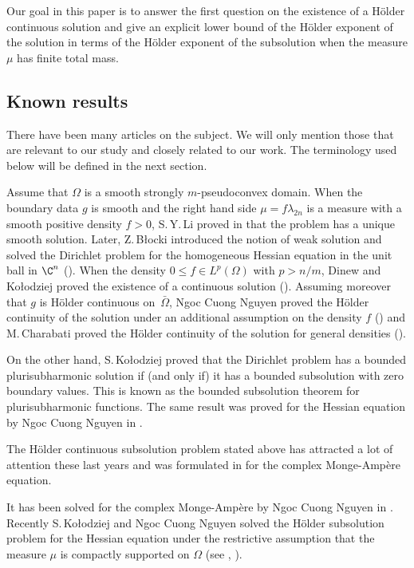 Our goal in this paper is to answer the first question on the existence of a Hölder continuous solution and give an explicit lower bound of the Hölder exponent of the solution in terms of the Hölder exponent of the subsolution when the measure $\mu$ has finite total mass.

\subsection{Known results}
There have been many articles on the subject. We will only mention those that are relevant to our study and closely related to our work.
The terminology used below will be defined in the next section.

Assume that $\Omega$ is a smooth strongly $m$-pseudoconvex domain. When the boundary data $g$ is smooth and the right hand side $\mu = f \lambda_{2n}$ is a measure with a smooth positive density $f > 0$, S.\,Y.\,Li proved in \cite{Li04} that the problem has a unique smooth solution. Later, Z.\,B\l ocki introduced the notion of weak solution and solved the Dirichlet problem for the homogeneous Hessian equation in the unit ball in $\C^n$ (\cite{Bl05}).
When the density $0 \leq f \in L^p (\Omega)$ with $p > n \slash m$, Dinew and Ko\l odziej proved the existence of a continuous solution (\cite{DK14}). Assuming moreover that $g$ is Hölder continuous on~$\bar \Omega$, Ngoc Cuong Nguyen proved the Hölder continuity of the solution under an additional assumption on the density $f$ (\cite{N14}) and M.\,Charabati proved the Hölder continuity of the solution for general densities (\cite{Ch16}).

On the other hand, S.\,Ko\l odziej \cite{Kol05} proved that the Dirichlet problem has a bounded plurisubharmonic solution if (and only if) it has a bounded subsolution with zero boundary values. This is known as the bounded subsolution theorem for plurisubharmonic functions. The same result was proved for the Hessian equation by Ngoc Cuong Nguyen in \cite{N13}.

The Hölder continuous subsolution problem stated above has attracted a lot of attention these last years and was formulated in \cite{DGZ16} for the complex Monge-Ampère equation.

\smallskip
It has been solved for the complex Monge-Ampère by Ngoc Cuong Nguyen in \cite{N18a,N18b}.
Recently S.\,Ko{\l}odziej and Ngoc Cuong Nguyen solved the Hölder subsolution problem for the Hessian equation under the restrictive assumption that the measure $\mu$ is compactly supported on $\Omega$ (see \cite{KN18}, \cite{KN19}).

